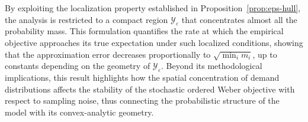 \documentclass[letter,11pt, reqno]{amsart}
\renewcommand{\;}{\quad}
\theoremstyle{thmstyleone}%
\theoremstyle{thmstyletwo}%
\theoremstyle{thmstylethree}%
\begin{document}
By exploiting the localization property established in Proposition~\ref{prop:eps-hull}, the analysis is restricted to a compact region $\mathcal Y_\varepsilon$ that concentrates almost all the probability mass. 
This formulation quantifies the rate at which the empirical objective approaches its true expectation under such localized conditions, showing that the approximation error decreases proportionally to $\sqrt{\min_i m_i}$, up to constants depending on the geometry of $\mathcal Y_\varepsilon$. 
Beyond its methodological implications, this result highlights how the spatial concentration of demand distributions affects the stability of the stochastic ordered Weber objective with respect to sampling noise, thus connecting the probabilistic structure of the model with its convex-analytic geometry.





\end{document}
